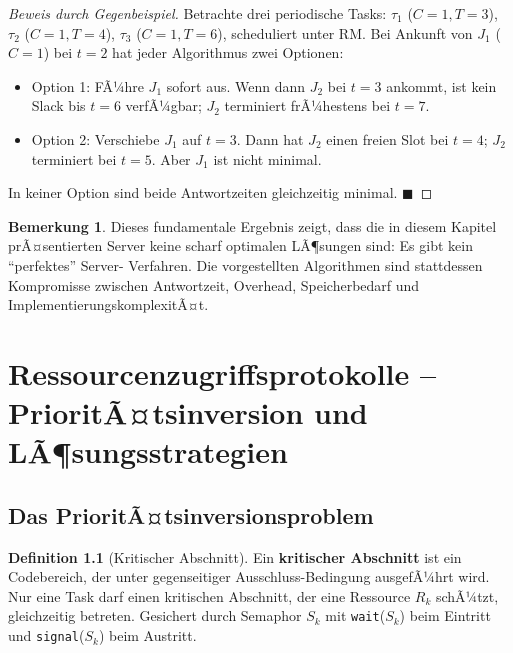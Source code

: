 ﻿\documentclass[a4paper,12pt]{report}
\theoremstyle{definition}
\newtheorem{definition}{Definition}[chapter]
\newtheorem{bemerkung}{Bemerkung}[chapter]
\begin{document}
\begin{proof}[Beweis durch Gegenbeispiel]
	Betrachte drei periodische Tasks: $\tau_1$ ($C=1, T=3$), $\tau_2$ ($C=1, T=4$),
	$\tau_3$ ($C=1, T=6$), scheduliert unter RM. Bei Ankunft von $J_1$ ($C=1$)
	bei $t=2$ hat jeder Algorithmus zwei Optionen:
	\begin{itemize}
		\item Option 1: FÃ¼hre $J_1$ sofort aus. Wenn dann $J_2$ bei $t=3$ ankommt,
		      ist kein Slack bis $t=6$ verfÃ¼gbar; $J_2$ terminiert frÃ¼hestens bei $t=7$.
		\item Option 2: Verschiebe $J_1$ auf $t=3$. Dann hat $J_2$ einen freien
		      Slot bei $t=4$; $J_2$ terminiert bei $t=5$. Aber $J_1$ ist nicht minimal.
	\end{itemize}
	In keiner Option sind beide Antwortzeiten gleichzeitig minimal. \hfill$\blacksquare$
\end{proof}

\begin{bemerkung}
	Dieses fundamentale Ergebnis zeigt, dass die in diesem Kapitel prÃ¤sentierten
	Server keine scharf optimalen LÃ¶sungen sind: Es gibt kein ``perfektes'' Server-
	Verfahren. Die vorgestellten Algorithmen sind stattdessen Kompromisse zwischen
	Antwortzeit, Overhead, Speicherbedarf und ImplementierungskomplexitÃ¤t.
\end{bemerkung}

\chapter{Ressourcenzugriffsprotokolle -- PrioritÃ¤tsinversion und LÃ¶sungsstrategien}
\label{chap:ressourcen}

\section{Das PrioritÃ¤tsinversionsproblem}

\begin{definition}[Kritischer Abschnitt]
	Ein \textbf{kritischer Abschnitt} ist ein Codebereich, der unter gegenseitiger
	Ausschluss-Bedingung ausgefÃ¼hrt wird. Nur eine Task darf einen kritischen
	Abschnitt, der eine Ressource $R_k$ schÃ¼tzt, gleichzeitig betreten.
	Gesichert durch Semaphor $S_k$ mit \texttt{wait}($S_k$) beim Eintritt und
	\texttt{signal}($S_k$) beim Austritt.
\end{definition}
\end{document}
